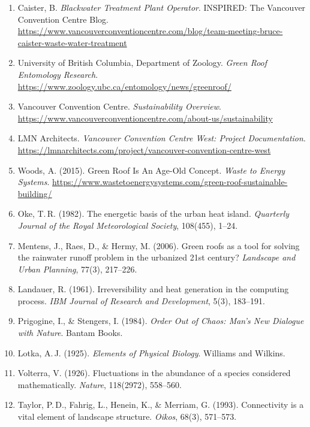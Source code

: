 \documentclass[12pt, a4paper]{article}
\theoremstyle{plain}
\theoremstyle{remark}
\begin{document}
\begin{enumerate}[leftmargin=1.5em, itemsep=0.3em]
  \item Caister, B. \textit{Blackwater Treatment Plant Operator}. INSPIRED: The Vancouver Convention Centre Blog. \url{https://www.vancouverconventioncentre.com/blog/team-meeting-bruce-caister-waste-water-treatment}

  \item University of British Columbia, Department of Zoology. \textit{Green Roof Entomology Research}. \url{https://www.zoology.ubc.ca/entomology/news/greenroof/}

  \item Vancouver Convention Centre. \textit{Sustainability Overview}. \url{https://www.vancouverconventioncentre.com/about-us/sustainability}

  \item LMN Architects. \textit{Vancouver Convention Centre West: Project Documentation}. \url{https://lmnarchitects.com/project/vancouver-convention-centre-west}

  \item Woods, A. (2015). Green Roof Is An Age-Old Concept. \textit{Waste to Energy Systems}. \url{https://www.wastetoenergysystems.com/green-roof-sustainable-building/}

  \item Oke, T.\,R. (1982). The energetic basis of the urban heat island. \textit{Quarterly Journal of the Royal Meteorological Society}, 108(455), 1--24.

  \item Mentens, J., Raes, D., \& Hermy, M. (2006). Green roofs as a tool for solving the rainwater runoff problem in the urbanized 21st century? \textit{Landscape and Urban Planning}, 77(3), 217--226.

  \item Landauer, R. (1961). Irreversibility and heat generation in the computing process. \textit{IBM Journal of Research and Development}, 5(3), 183--191.

  \item Prigogine, I., \& Stengers, I. (1984). \textit{Order Out of Chaos: Man's New Dialogue with Nature}. Bantam Books.

  \item Lotka, A.\,J. (1925). \textit{Elements of Physical Biology}. Williams and Wilkins.

  \item Volterra, V. (1926). Fluctuations in the abundance of a species considered mathematically. \textit{Nature}, 118(2972), 558--560.

  \item Taylor, P.\,D., Fahrig, L., Henein, K., \& Merriam, G. (1993). Connectivity is a vital element of landscape structure. \textit{Oikos}, 68(3), 571--573.
\end{enumerate}
\end{document}

